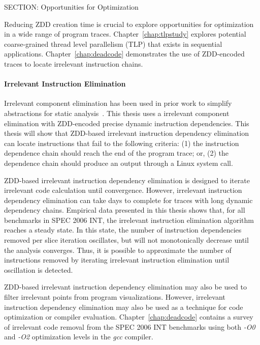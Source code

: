 {SECTION: Opportunities for Optimization


Reducing ZDD creation time is crucial to explore opportunities for optimization in a wide range of program traces. Chapter~\ref{chap:tlpstudy} explores potential coarse-grained thread level parallelism (TLP) that exists in sequential applications. Chapter~\ref{chap:deadcode} demonstrates the use of ZDD-encoded traces to locate irrelevant instruction chains.

\noindent\paragraph{Irrelevant Instruction Elimination}

Irrelevant component elimination has been used in prior work to simplify abstractions for static analysis~\cite{corbett:icsc:2000}. This thesis uses a irrelevant component elimination with ZDD-encoded precise dynamic instruction dependencies.  This thesis will show that ZDD-based irrelevant instruction dependency elimination can locate instructions that fail to the following criteria: (1) the instruction dependence chain should reach the end of the program trace; or, (2) the dependence chain should produce an output through a Linux system call.

ZDD-based irrelevant instruction dependency elimination is designed to iterate irrelevant code calculation until convergence.  However, irrelevant instruction dependency elimination can take days to complete for traces with long dynamic dependency chains. Empirical data presented in this thesis shows that, for all benchmarks in SPEC 2006 INT, the irrelevant instruction elimination algorithm reaches a steady state.  In this state, the number of instruction dependencies removed per slice iteration oscillates, but will not monotonically decrease until the analysis converges.  Thus, it is possible to approximate the number of instructions removed by iterating irrelevant instruction elimination until oscillation is detected.

ZDD-based irrelevant instruction dependency elimination may also be used to filter irrelevant points from program visualizations. However, irrelevant instruction dependency elimination may also be used as a technique for code optimization or compiler evaluation. Chapter~\ref{chap:deadcode} contains a survey of irrelevant code removal from the SPEC 2006 INT benchmarks using both \textit{-O0} and \textit{-O2} optimization levels in the \textit{gcc} compiler.

}
